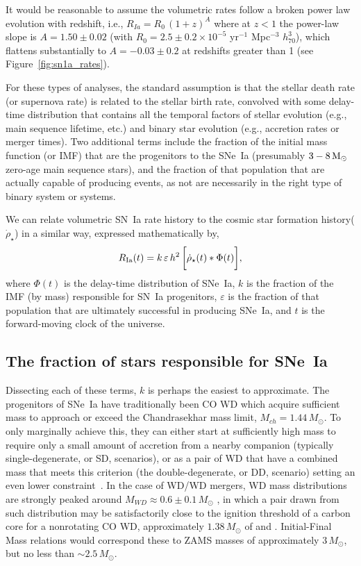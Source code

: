 \documentclass[apj]{aastex}
\begin{document}
It would be reasonable to assume the volumetric rates follow a broken power law evolution with redshift, i.e., $R_{Ia}=R_0\,(1+z)^A$ where at $z<1$ the power-law slope is $A=1.50\pm0.02$ (with $R_0 = 2.5\pm0.2\times10^{-5}$ yr$^{-1}$ Mpc$^{-3}$ $h_{70}^3$), which flattens substantially to $A=-0.03\pm0.2$ at redshifts greater than 1 (see Figure~\ref{fig:sn1a_rates}). 

For these types of analyses, the standard assumption is that the stellar death rate (or supernova rate) is related to the stellar birth rate, convolved with some delay-time distribution that contains all the temporal factors of stellar evolution (e.g., main sequence lifetime, etc.) and binary star evolution (e.g., accretion rates or merger times). Two additional terms include the fraction of the initial mass function (or IMF) that are the progenitors to the SNe~Ia (presumably $3 - 8\, \rm{M}_{\odot}$ zero-age main sequence stars), and the fraction of that population that are actually capable of producing events, as not are necessarily in the right type of binary system or systems.

We can relate volumetric SN~Ia rate history to the cosmic star formation history($\dot{\rho}_{\star}$) in a similar way, expressed mathematically by, 
\begin{equation}
R_{\rm Ia}(t) = k\,\varepsilon\, h^2\,\biggl[\dot{\rho}_{\star}(t) \ast \Phi(t)\biggr],
\label{eqn:std}
\end{equation}
\noindent where $\Phi(t)$ is the delay-time distribution of SNe~Ia, $k$ is the fraction of the IMF (by mass) responsible for SN~Ia progenitors, $\varepsilon$ is the fraction of that population that are ultimately successful in producing SNe~Ia, and $t$ is the forward-moving clock of the universe. 

\subsection{The fraction of stars responsible for SNe~Ia}
Dissecting each of these terms, $k$ is perhaps the easiest to approximate. The progenitors of SNe~Ia have traditionally been CO WD which acquire sufficient mass to approach or exceed the Chandrasekhar mass limit, $M_{ch}=1.44\,M_{\odot}$. To only marginally achieve this, they can either start at sufficiently high mass to require only a small amount of accretion from a nearby companion (typically single-degenerate, or SD, scenarios), or as a pair of WD that have a combined mass that meets this criterion (the double-degenerate, or DD, scenario) setting an even lower constraint~\cite[see][for a review]{Maoz:2013}. In the case of WD/WD mergers, WD mass distributions are strongly peaked around $M_{WD}\approx0.6\pm0.1\,M_{\odot}$ \citep{Catalan:2008il}, in which a pair drawn from such distribution may be satisfactorily close to the ignition threshold of a carbon core for a nonrotating CO WD, approximately $1.38\, M_{\odot}$ of \cite{Arnett:1969dw} and \cite{Nomoto:1982vh}. Initial-Final Mass relations \cite[e.g.,][]{Catalan:2008il,Cummings:2018oe} would correspond these to ZAMS masses of approximately $3\, M_{\odot}$, but no less than $\sim2.5\, M_{\odot}$. 
\end{document}
